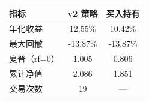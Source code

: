 \begin{tabular}{lcc}
\toprule
指标 & v2 策略 & 买入持有 \\
\midrule
年化收益 & 12.55\% & 10.42\% \\
最大回撤 & -13.87\% & -13.87\% \\
夏普（rf=0） & 1.005 & 0.806 \\
累计净值 & 2.086 & 1.851 \\
交易次数 & 19 & --- \\
\bottomrule
\end{tabular}
